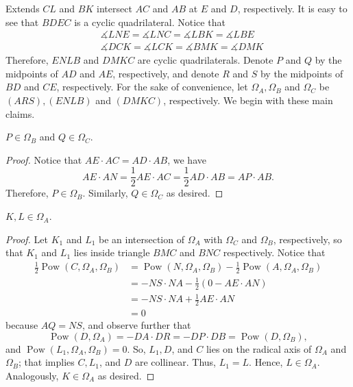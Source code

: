 \documentclass[11pt]{article}
\begin{document}
Extends $CL$ and $BK$ intersect $AC$ and $AB$ at $E$ and $D$, respectively. It is easy to see that $BDEC$ is a cyclic quadrilateral. Notice that
\begin{align*}
&\measuredangle{LNE}=\measuredangle{LNC}=\measuredangle{LBK}=\measuredangle{LBE}\\
&\measuredangle{DCK}=\measuredangle{LCK}=\measuredangle{BMK}=\measuredangle{DMK}
\end{align*}Therefore, $ENLB$ and $DMKC$ are cyclic quadrilaterals. Denote $P$ and $Q$ by the midpoints of $AD$ and $AE$, respectively, and denote $R$ and $S$ by the midpoints of $BD$ and $CE$, respectively. For the sake of convenience, let $\Omega_A,\Omega_B$ and $\Omega_C$ be $(ARS),(ENLB)$ and $(DMKC)$, respectively. We begin with these main claims.
\begin{claim}
$P\in \Omega_B$ and $Q\in \Omega_C$.
\end{claim}
\begin{proof}
    Notice that $AE\cdot AC=AD\cdot AB$, we have
$$AE\cdot AN=\frac{1}{2}AE\cdot AC=\frac{1}{2}AD\cdot AB=AP\cdot AB.$$Therefore, $P\in \Omega_B$. Similarly, $Q\in \Omega_C$ as desired.
\end{proof}

\begin{claim}
     $K,L\in \Omega_A$.
\end{claim}
\begin{proof}
    Let $K_1$ and $L_1$ be an intersection of $\Omega_A$ with $\Omega_C$ and $\Omega_B$, respectively, so that $K_1$ and $L_1$ lies inside triangle $BMC$ and $BNC$ respectively. Notice that
\begin{align*}
    \frac{1}{2}\operatorname{Pow}(C,\Omega_A,\Omega_B)&=\operatorname{Pow}(N,\Omega_A,\Omega_B)-\frac{1}{2}\operatorname{Pow}(A,\Omega_A,\Omega_B)\\
    &=-NS\cdot NA-\frac{1}{2}(0-AE\cdot AN)\\
    &=-NS\cdot NA+\frac{1}{2}AE\cdot AN\\
    &=0
\end{align*}because $AQ=NS$, and observe further that
$$
    \operatorname{Pow}(D,\Omega_A)=-DA\cdot DR=-DP\cdot DB=\operatorname{Pow}(D,\Omega_B),
$$and $\operatorname{Pow}(L_1,\Omega_A,\Omega_B)=0$. So, $L_1,D$, and $C$ lies on the radical axis of $\Omega_A$ and $\Omega_B$; that implies $C,L_1$, and $D$ are collinear. Thus, $L_1=L$. Hence, $L\in \Omega_A$. Analogously, $K\in \Omega_A$ as desired.
\end{proof}
\end{document}
